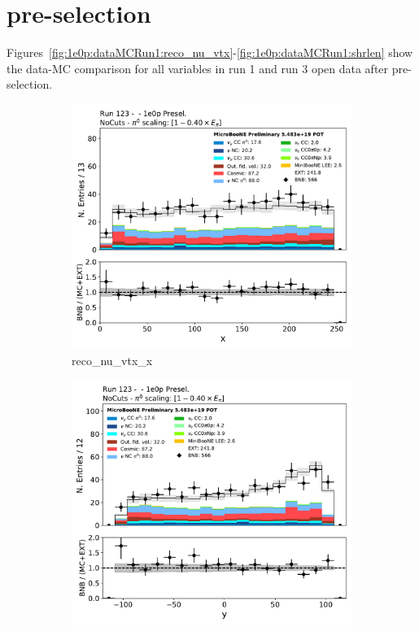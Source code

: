 \section{\zpsel pre-selection}
\label{app:nuepresel}

Figures~\ref{fig:1e0p:dataMCRun1:reco_nu_vtx}-\ref{fig:1e0p:dataMCRun1:shrlen} show the data-MC comparison for all \zpsel variables in run 1 and run 3 open data after \zpsel pre-selection.

\begin{figure}[H] 
\begin{center}
    \begin{subfigure}[b]{0.3\textwidth}
    \centering
    \includegraphics[width=1.00\textwidth]{1e0p/dataMCRun123/reco_nu_vtx_x.pdf}
    \caption{\label{fig:1e0p:dataMCRun1:reco_nu_vtx_x} reco\_nu\_vtx\_x }
    \end{subfigure}
    \begin{subfigure}[b]{0.3\textwidth}
    \centering
    \includegraphics[width=1.00\textwidth]{1e0p/dataMCRun123/reco_nu_vtx_y.pdf}

\end{subfigure}
\end{center}
\end{figure}
